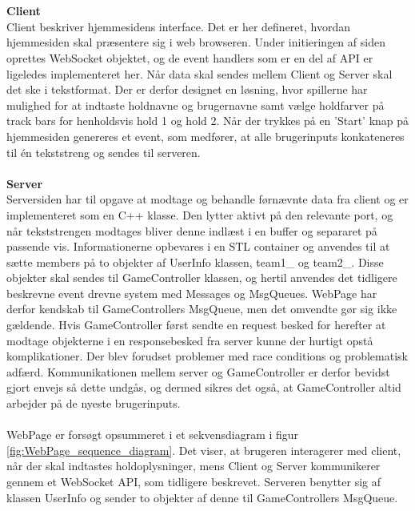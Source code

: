 \documentclass[Rapport/Rapport_main.tex]{subfiles}
\begin{document}
\\\\\textbf{Client}
\\Client beskriver hjemmesidens interface. Det er her defineret, hvordan hjemmesiden skal præsentere sig i web browseren. Under initieringen af siden oprettes WebSocket objektet, og de event handlers som er en del af API er ligeledes implementeret her. Når data skal sendes mellem Client og Server skal det ske i tekstformat. Der er derfor designet en løsning, hvor spillerne har mulighed for at indtaste holdnavne og brugernavne samt vælge holdfarver på track bars for henholdsvis hold 1 og hold 2. Når der trykkes på en 'Start' knap på hjemmesiden genereres et event, som medfører, at alle brugerinputs konkateneres til én tekststreng og sendes til serveren. 
\\\\\textbf{Server}
\\Serversiden har til opgave at modtage og behandle førnævnte data fra client og er implementeret som en C++ klasse. Den lytter aktivt på den relevante port, og når tekststrengen modtages bliver denne indlæst i en buffer og separaret på passende vis. Informationerne opbevares i en STL container og anvendes til at sætte members på to objekter af UserInfo klassen, team1\_ og team2\_. Disse objekter skal sendes til GameController klassen, og hertil anvendes det tidligere beskrevne event drevne system med Messages og MsgQueues. WebPage har derfor kendskab til GameControllers MsgQueue, men det omvendte gør sig ikke gældende. Hvis GameController først sendte en request besked for herefter at modtage objekterne i en responsebesked fra server kunne der hurtigt opstå komplikationer. Der blev forudset problemer med race conditions og problematisk adfærd. Kommunikationen mellem server og GameController er derfor bevidst gjort envejs så dette undgås, og dermed sikres det også, at GameController altid arbejder på de nyeste brugerinputs.\\\\WebPage er forsøgt opsummeret i et sekvensdiagram i figur \ref{fig:WebPage_sequence_diagram}. Det viser, at brugeren interagerer med client, når der skal indtastes holdoplysninger, mens Client og Server kommunikerer gennem et WebSocket API, som tidligere beskrevet. Serveren benytter sig af klassen UserInfo og sender to objekter af denne til GameControllers MsgQueue.  
\end{document}
